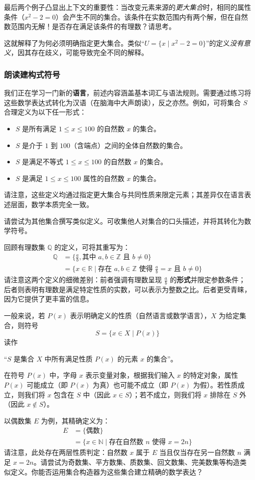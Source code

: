 最后两个例子凸显出上下文的重要性：当改变元素来源的\emph{更大集合}时，相同的属性条件（$x^2 -2 = 0$）会产生不同的集合。该条件在实数范围内有两个解，但在自然数范围内无解！是否存在满足该条件的有理数？请思考。

这就解释了为何必须明确指定更大集合。类似``$U = \{x \mid x^2 - 2 = 0\}$''的定义\emph{没有意义}，因其存在歧义，可能导致完全不同的解释。

\subsubsection*{朗读建构式符号}

我们正在学习一门新的\textbf{语言}，前述内容涵盖基本词汇与语法规则。需要通过练习将这些数学表达式转化为汉语（在脑海中大声朗读），反之亦然。例如，可将集合 $S$ 合理定义为以下任一形式：
\begin{itemize}
    \item $S$ 是所有满足 $1 \leq x \leq 100$ 的自然数 $x$ 的集合。
    \item $S$ 是介于 $1$ 到 $100$（含端点）之间的全体自然数的集合。
    \item $S$ 是满足不等式 $1 \leq x \leq 100$ 的自然数 $x$ 的集合。
    \item $S$ 是满足 $1 \le x \le 100$ 属性的自然数 $x$ 的集合。
\end{itemize}
请注意，这些定义均通过指定更大集合与共同性质来限定元素；其差异仅在语言表述层面，数学本质完全一致。

请尝试为其他集合撰写类似定义。可收集他人对集合的口头描述，并将其转化为数学符号。

回顾有理数集 $\mathbb{Q}$ 的定义，可将其重写为：
\begin{align*}
    \mathbb{Q} &= \Big\{\frac{a}{b}, \text{其中\ } a,b \in \mathbb{Z} \text{\ 且\ } b \ne 0\Big\}\\
               &= \Big\{x \in \mathbb{R} \mid \text{存在\ } a, b \in \mathbb{Z} \text{\ 使得\ } \frac{a}{b}= x \text{\ 且\ } b \ne 0\Big\}
\end{align*}
请注意这两个定义的细微差别：前者强调有理数呈现 $\frac{a}{b}$ 的\textbf{形式}并限定参数条件；后者则表明有理数是满足特定性质的实数，可以表示为整数之比。后者更受青睐，因为它提供了更丰富的信息。

一般来说，若 $P(x)$ 表示明确定义的性质（自然语言或数学语言），$X$ 为给定集合，则符号
\[S = \{x \in X \mid P(x)\}\]
读作
\begin{center}``$S$ 是集合 $X$ 中所有满足性质 $P(x)$ 的元素 $x$ 的集合''。\end{center}
在符号 $P(x)$ 中，字母 $x$ 表示变量对象，根据我们输入 $x$ 的特定对象，属性 $P(x)$ 可能成立（即 $P(x)$ 为真）也可能不成立（即 $P (x)$ 为假）。若性质成立，则我们将 $x$ 包含在 $S$ 中（因此 $x \in S$）；若不成立，则我们将 $x$ 排除在 $S$ 外（因此 $x \notin S$）。

以偶数集 $E$ 为例，其精确定义为：
\begin{align*}
    E &= \{\text{偶数}\} \\
      &= \{x \in \mathbb{N} \mid \text{存在自然数\ } n \text{\ 使得\ } x = 2n\}
\end{align*}
请注意，此处存在两层性质判定：自然数 $x$ 属于 $E$ 当且仅当存在另一自然数 $n$ 满足 $x = 2n$。请尝试为奇数集、平方数集、质数集、回文数集、完美数集等构造类似定义。你能否运用集合构造器为这些集合建立精确的数学表达？
